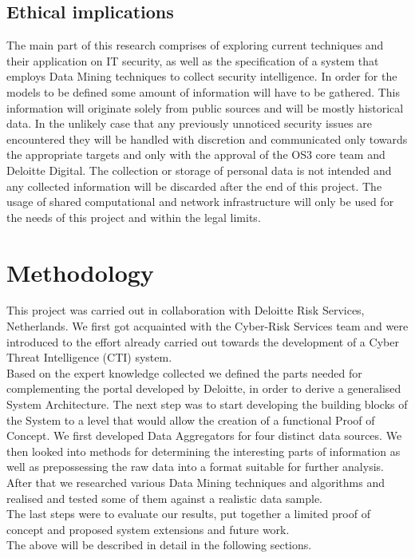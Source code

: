 \documentclass[12pt]{article}
\begin{document}
\subsection{Ethical implications}
The main part of this research comprises of exploring current techniques and their application on IT security, as well as the specification of a system that employs Data Mining techniques to collect security intelligence. In order for the models to be defined some amount of information will have to be gathered. This information will originate solely from public sources and will be mostly historical data. In the unlikely case that any previously unnoticed security issues are encountered they will be handled with discretion and communicated only towards the appropriate targets and only with the approval of the OS3 core team and Deloitte Digital. The collection or storage of personal data is not intended and any collected information will be discarded after the end of this project. The usage of shared computational and network infrastructure will only be used for the needs of this project and within the legal limits.

\newpage
\section{Methodology}
This project was carried out in collaboration with Deloitte Risk Services, Netherlands. We first got acquainted with the Cyber-Risk Services team and were introduced to the effort already carried out towards the development of a Cyber Threat Intelligence (CTI) system. \\
Based on the expert knowledge collected we defined the parts needed for complementing the portal developed by Deloitte, in order to derive a generalised System Architecture. The next step was to start developing the building blocks of the System to a level that would allow the creation of a functional Proof of Concept. We first developed Data Aggregators for four distinct data sources. We then looked into methods for determining the interesting parts of information as well as prepossessing the raw data into a format suitable for further analysis. After that we researched various Data Mining techniques and algorithms and realised and tested some of them against a realistic data sample. \\
The last steps were to evaluate our results, put together a limited proof of concept and proposed system extensions and future work. \\
The above will be described in detail in the following sections. 
\end{document}
